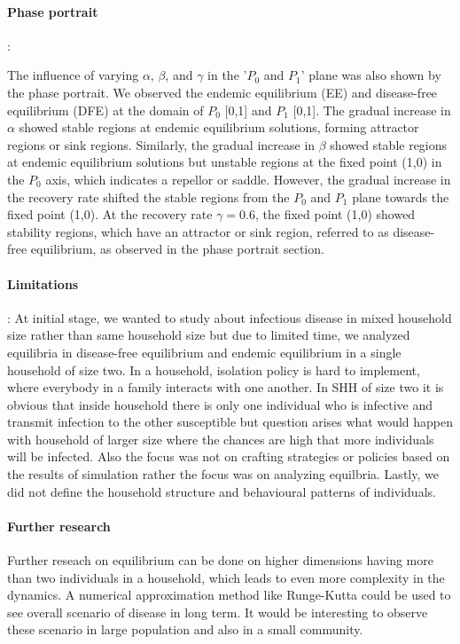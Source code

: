 \documentclass[paper=a4, fontsize=11pt, twoside, BCOR=12mm, parskip=full, listof=totoc]{scrreprt}
\begin{document}
{\paragraph*{Phase portrait}:

The influence of varying $\alpha$, $\beta$, and $\gamma$ in the '$P_0$ and $P_1$' plane was also shown by the phase portrait. We observed the endemic equilibrium (EE) and disease-free equilibrium (DFE) at the domain of $P_0$ [0,1] and $P_1$ [0,1]. The gradual increase in $\alpha$ showed stable regions at endemic equilibrium solutions, forming attractor regions or sink regions. Similarly, the gradual increase in $\beta$ showed stable regions at endemic equilibrium solutions but unstable regions at the fixed point (1,0) in the $P_0$ axis, which indicates a repellor or saddle. However, the gradual increase in the recovery rate shifted the stable regions from the $P_0$ and $P_1$ plane towards the fixed point (1,0). At the recovery rate $\gamma=0.6$, the fixed point (1,0) showed stability regions, which have an attractor or sink region, referred to as disease-free equilibrium, as observed in the phase portrait section.

\paragraph*{Limitations}:
At initial stage, we wanted to study about infectious disease in mixed household size rather than same household size but due to limited time, we analyzed equilibria in disease-free equilibrium and endemic equilibrium in a single household of size two. In a household, isolation policy is hard to implement, where everybody in a family interacts with one another. In SHH of size two it is obvious that inside household there is only one individual who is infective and transmit infection to the other susceptible but question arises what would happen with household of larger size where the chances are high that more individuals will be infected. Also the focus was not on crafting strategies or policies based on the results of simulation rather the focus was on analyzing equilbria. Lastly, we did not define the household structure and behavioural patterns of individuals.\\
  

\paragraph*{Further research}
Further reseach on equilibrium can be done on higher dimensions having more than two individuals in a household, which leads to even more complexity in the dynamics. A numerical approximation method like Runge-Kutta could be used to see overall scenario of disease in long term. It would be interesting to observe these scenario in large population and also in a small community.\\  

}
\end{document}

